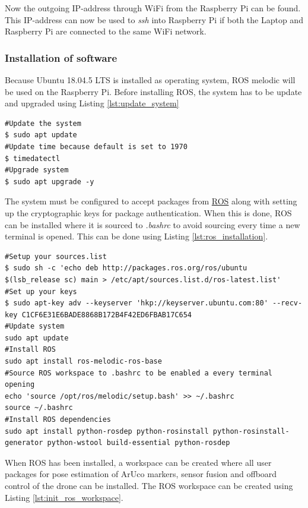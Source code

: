 \documentclass[../Head/report.tex]{subfiles}
\begin{document}
Now the outgoing IP-address through WiFi from the Raspberry Pi can be found. This IP-address can now be used to \textit{ssh} into Raspberry Pi if both the Laptop and Raspberry Pi are connected to the same WiFi network.

\subsubsection{Installation of software}

Because Ubuntu 18.04.5 LTS is installed as operating system, ROS melodic will be used on the Raspberry Pi. Before installing ROS, the system has to be update and upgraded using Listing \ref{lst:update_system}

\begin{lstlisting}[frame=none, caption={Updating the system before software installation},label=lst:update_system]
#Update the system
$ sudo apt update
#Update time because default is set to 1970
$ timedatectl 
#Upgrade system 
$ sudo apt upgrade -y
\end{lstlisting} 

The system must be configured to accept packages from \href{http://wiki.ros.org/melodic/Installation/Ubuntu}{ROS} along with setting up the cryptographic keys for package authentication. When this is done, ROS can be installed where it is sourced to \textit{.bashrc} to avoid sourcing every time a new terminal is opened. This can be done using Listing \ref{lst:ros_installation}. 

\begin{lstlisting}[frame=none, caption={ROS installation and source to \textit{.bashrc}},label=lst:ros_installation]
#Setup your sources.list
$ sudo sh -c 'echo deb http://packages.ros.org/ros/ubuntu $(lsb_release sc) main > /etc/apt/sources.list.d/ros-latest.list'
#Set up your keys
$ sudo apt-key adv --keyserver 'hkp://keyserver.ubuntu.com:80' --recv-key C1CF6E31E6BADE8868B172B4F42ED6FBAB17C654
#Update system
sudo apt update
#Install ROS
sudo apt install ros-melodic-ros-base
#Source ROS workspace to .bashrc to be enabled a every terminal opening
echo 'source /opt/ros/melodic/setup.bash' >> ~/.bashrc
source ~/.bashrc
#Install ROS dependencies 
sudo apt install python-rosdep python-rosinstall python-rosinstall-generator python-wstool build-essential python-rosdep
\end{lstlisting}

When ROS has been installed, a workspace can be created where all user packages for pose estimation of ArUco markers, sensor fusion and offboard control of the drone can be installed. The ROS workspace can be created using Listing \ref{lst:init_ros_workspace}. 
\end{document}

